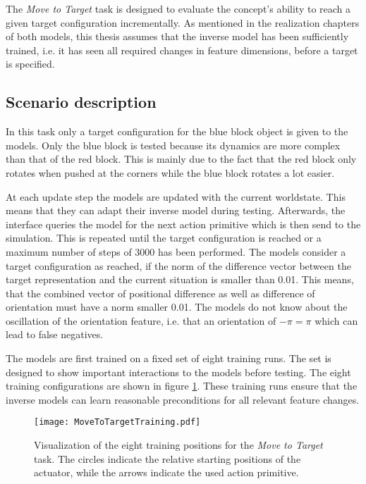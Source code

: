 The \textit{Move to Target} task is designed to evaluate the concept's ability to reach a given target configuration incrementally. As mentioned in the 
realization chapters of both models, this thesis assumes that the inverse model has been sufficiently trained, i.e. it has seen all required changes in feature dimensions, before a target is specified. 

\subsection{Scenario description}

In this task only a target configuration for the blue block object is given to the models. Only the blue block is tested because its dynamics are more complex than that of the red block. This is mainly due to the fact that the red block only rotates when pushed at the corners while the blue block rotates a lot easier.

At each update step the models are updated with the current worldstate.
This means that they can adapt their inverse model during testing.
Afterwards, the interface queries the model for the next action primitive which is then send to the simulation. This is repeated until the target configuration is reached or a maximum number of steps of 3000 has been performed.
The models consider a target configuration as reached, if the norm of the difference vector between the target representation and the current situation is smaller than 0.01. This means, that the combined vector of positional difference as well as difference of orientation must have a norm smaller 0.01. The models do not know about the oscillation of the orientation feature, i.e. that an orientation of $-\pi = \pi$ which can lead to false negatives.

The models are first trained on a fixed set of eight training runs. The set is designed to show important interactions to the models before testing. The eight training configurations are shown in figure \ref{fig:moveToTargetTraining}.
These training runs ensure that the inverse models can learn reasonable preconditions for all relevant feature changes.

\begin{figure}
\centering
\texttt{[image: MoveToTargetTraining.pdf]}
\caption{Visualization of the eight training positions for the \textit{Move to Target} task. The circles indicate the relative starting positions of the actuator, while the arrows indicate the used action primitive.}
\label{fig:moveToTargetTraining}
\end{figure}

